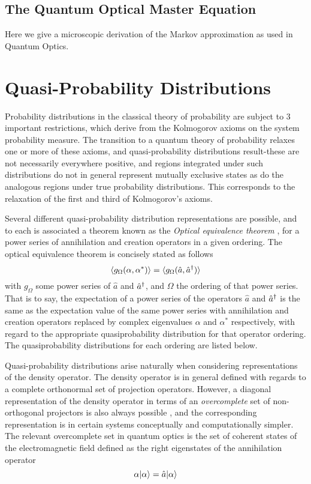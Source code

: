\subsection{The Quantum Optical Master Equation}\cite{Breuer2002}\cite{Walls2008}
Here we give a microscopic derivation of the Markov approximation as used in Quantum Optics.

\section{Quasi-Probability Distributions}
Probability distributions in the classical theory of probability are subject to 3 important restrictions, which derive from the Kolmogorov axioms on the system probability measure.
The transition to a quantum theory of probability relaxes one or more of these axioms, and quasi-probability distributions result-these are not necessarily everywhere positive, and regions integrated under such distributions do not in general represent mutually exclusive states as do the analogous regions under true probability distributions.
This corresponds to the relaxation of the first and third of Kolmogorov's axioms.

Several different quasi-probability distribution representations are possible\cite{Walls2008}, and to each is associated a theorem known as the \emph{Optical equivalence theorem} \cite{Sudarshan1963}, for a power series of annihilation and creation operators in a given ordering.
The optical equivalence theorem is concisely stated as follows
\begin{equation}
	\langle g_{\Omega} (\alpha, \alpha^*) \rangle = \langle g_{\Omega} (\hat{a}, \hat{a}^\dagger) \rangle
\end{equation}
with $g_\Omega$ some power series of $\hat{a}$ and $\hat{a}^\dagger$, and $\Omega$ the ordering of that power series.
That is to say, the expectation of a power series of the operators $\hat{a}$ and $\hat{a}^\dagger$ is the same as the expectation value of the same power series with annihilation and creation operators replaced by complex eigenvalues $\alpha$ and $\alpha^*$ respectively, with regard to the appropriate quasiprobability distribution for that operator ordering.
The quasiprobability distributions for each ordering are listed below.

Quasi-probability distributions arise naturally when considering representations of the density operator.
The density operator is in general defined with regards to a complete orthonormal set of projection operators.
However, a diagonal representation of the density operator in terms of an \emph{overcomplete} set of non-orthogonal projectors is also always possible \cite{Sudarshan1963}, and the corresponding representation is in certain systems conceptually and computationally simpler.
The relevant overcomplete set in quantum optics is the set of coherent states of the electromagnetic field defined as the right eigenstates of the annihilation operator
\begin{equation}
\alpha | \alpha \rangle = \hat{a} | \alpha \rangle
\end{equation}
